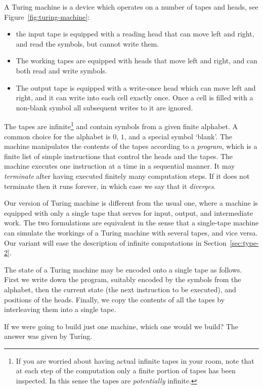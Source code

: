 A Turing machine is a device which operates on a number of tapes and
heads, see Figure~\ref{fig:turing-machine}:
%
\begin{itemize}
\item the input tape is equipped with a reading head that can move
  left and right, and read the symbols, but cannot write them.
\item The working tapes are equipped with heads that move left and
  right, and can both read and write symbols.
\item The output tape is equipped with a write-once head which can
  move left and right, and it can write into each cell exactly once.
  Once a cell is filled with a non-blank symbol all subsequent writes
  to it are ignored.
\end{itemize}
%
The tapes are infinite\footnote{If you are worried about having actual
  infinite tapes in your room, note that at each step of the
  computation only a finite portion of tapes has been inspected. In
  this sense the tapes are \emph{potentially} infinite.} and contain
symbols from a given finite alphabet. A common choice for the alphabet
is $0$, $1$, and a special symbol `blank'. The machine manipulates the
contents of the tapes according to a \emph{program}, which is a finite
list of simple instructions that control the heads and the tapes. The
machine executes one instruction at a time in a sequential manner. It
may \emph{terminate} after having executed finitely many computation
steps. If it does not terminate then it runs forever, in which case we
say that it \emph{diverges}.

Our version of Turing machine is different from the usual one, where a
machine is equipped with only a single tape that serves for input,
output, and intermediate work. The two formulations are equivalent in
the sense that a single-tape machine can simulate the workings of a
Turing machine with several tapes, and vice versa. Our variant will
ease the description of infinite computations in
Section~\ref{sec:type-2}.

The state of a Turing machine may be encoded onto a single tape as
follows. First we write down the program, suitably encoded by the
symbols from the alphabet, then the current state (the next
instruction to be executed), and positions of the heads. Finally, we
copy the contents of all the tapes by interleaving them into a single
tape.

If we were going to build just one machine, which one would we build?
The answer was given by Turing.

